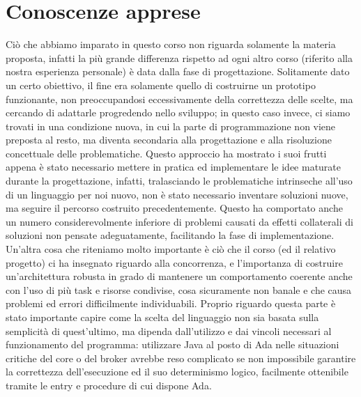 
\chapter{Conoscenze apprese} %

\label{Chapter8} %

Ciò che abbiamo imparato in questo corso non riguarda solamente la materia proposta, infatti la più grande differenza rispetto ad ogni altro corso (riferito alla nostra esperienza personale) è data dalla fase di progettazione. Solitamente dato un certo obiettivo, il fine era solamente quello di costruirne un prototipo funzionante, non preoccupandosi eccessivamente della correttezza delle scelte, ma cercando di adattarle progredendo nello sviluppo; in questo caso invece, ci siamo trovati in una condizione nuova, in cui la parte di programmazione non viene preposta al resto, ma diventa secondaria alla progettazione e alla risoluzione concettuale delle problematiche. 
Questo approccio ha mostrato i suoi frutti appena è stato necessario mettere in pratica ed implementare le idee maturate durante la progettazione, infatti, tralasciando le problematiche intrinseche all’uso di un linguaggio per noi nuovo, non è stato necessario inventare soluzioni nuove, ma seguire il percorso costruito precedentemente. Questo ha comportato anche un numero considerevolmente inferiore di problemi causati da effetti collaterali di soluzioni non pensate adeguatamente, facilitando la fase di implementazione.
Un’altra cosa che riteniamo molto importante è ciò che il corso (ed il relativo progetto) ci ha insegnato riguardo alla concorrenza, e l’importanza di costruire un’architettura robusta in grado di mantenere un comportamento coerente anche con l’uso di più task e risorse condivise, cosa sicuramente non banale e che causa problemi ed errori difficilmente individuabili. Proprio riguardo questa parte è stato importante capire come la scelta del linguaggio non sia basata sulla semplicità di quest’ultimo, ma dipenda dall’utilizzo e dai vincoli necessari al funzionamento del programma: utilizzare Java al posto di Ada nelle situazioni critiche del core o del broker avrebbe reso complicato se non impossibile garantire la correttezza dell’esecuzione ed il suo determinismo logico, facilmente ottenibile tramite le entry e procedure di cui dispone Ada.
